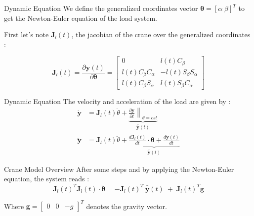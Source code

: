 \begin{frame}{Dynamic Equation}
 We define the generalized coordinates vector \(\boldsymbol{\theta} = \left[ \alpha \; \beta \right]^T\) to get the Newton-Euler equation of the load system. 

 First let's note  \( \boldsymbol{J}_{l}(t)\), the jacobian of the crane over the generalized coordinates : 

\begin{equation}
     \boldsymbol{J}_{l}(t) = \frac{\partial \boldsymbol{y}(t)}{\partial \boldsymbol{\theta}} = \begin{bmatrix}
         0                       & l(t)C_\beta \\
         l(t)C_\beta C_\alpha    & -l(t)S_\beta S_\alpha \\
         l(t)C_\beta S_\alpha    & l(t)S_\beta C_\alpha
     \end{bmatrix}
\end{equation}
\end{frame}

\begin{frame}{Dynamic Equation}
The velocity and acceleration of the load are given by : 
\begin{align}
    \dot{\boldsymbol{y}} &= \boldsymbol{J}_{l}(t) \dot{\theta} + \underbrace{ \left. \frac{\partial \boldsymbol{y}}{\partial t} \right\|_{\theta=cst}}_{\bar{\dot{\boldsymbol{y}}}(t)} \\
    \ddot{\boldsymbol{y}} &= \boldsymbol{J}_{l}(t) \ddot{\theta} + \underbrace{\frac{d\boldsymbol{J}_{l}(t)}{dt} \cdot \dot{\boldsymbol{\theta}} + \frac{d\bar{\dot{\boldsymbol{y}}}(t)}{dt}}_{\bar{\ddot{\boldsymbol{y}}}(t)}
\end{align}
\end{frame}

\begin{frame}{Crane Model Overview}
    After some steps and by applying the Newton-Euler equation, the system reads :
    \begin{equation}
\label{eq:equation_of_motion_generalized_coordinates}
    \boldsymbol{J}_{l}(t)^T\boldsymbol{J}_{l}(t)\cdot \ddot{\boldsymbol{\theta}} = -\boldsymbol{J}_{l}(t)^T \: \bar{\ddot{\boldsymbol{y}}}(t) \; + \; \boldsymbol{J}_{l}(t)^T\boldsymbol{g}
\end{equation}

Where \(\boldsymbol{g} = \begin{bmatrix} 0 & 0 & -g\end{bmatrix}^T\) denotes the gravity vector.
\end{frame}

